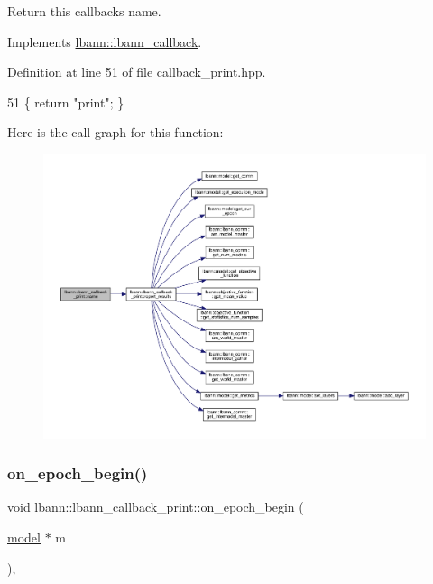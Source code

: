Return this callback\textquotesingle{}s name. 

Implements \hyperlink{classlbann_1_1lbann__callback_a7522c7a14f1d6a1ea762cc2d7248eb3a}{lbann\+::lbann\+\_\+callback}.



Definition at line 51 of file callback\+\_\+print.\+hpp.


\begin{DoxyCode}
51 \{ \textcolor{keywordflow}{return} \textcolor{stringliteral}{"print"}; \}
\end{DoxyCode}
Here is the call graph for this function\+:\nopagebreak
\begin{figure}[H]
\begin{center}
\leavevmode
\includegraphics[width=350pt]{classlbann_1_1lbann__callback__print_a212640539d73eec3317572150a11b71b_cgraph}
\end{center}
\end{figure}
\mbox{\label{classlbann_1_1lbann__callback__print_ae3c99d7c56ac33ab7e09880134b43cad}} 
\subsubsection{\texorpdfstring{on\+\_\+epoch\+\_\+begin()}{on\_epoch\_begin()}}
{\footnotesize\ttfamily void lbann\+::lbann\+\_\+callback\+\_\+print\+::on\+\_\+epoch\+\_\+begin (\begin{DoxyParamCaption}\item[{\hyperlink{classlbann_1_1model}{model} $\ast$}]{m }\end{DoxyParamCaption})\hspace{0.3cm}{\ttfamily [override]}, {\ttfamily [virtual]}}

